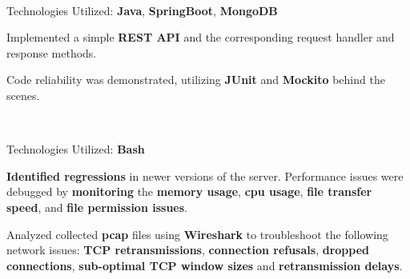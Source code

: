 \documentclass[]{deedy-resume-openfont}
\begin{document}
\begin{minipage}[t]{0.66\textwidth}
\\
\begin{tightemize}
\item Technologies Utilized: \textbf{Java}, \textbf{SpringBoot}, \textbf{MongoDB}
\item Implemented a simple \textbf{REST API} and the corresponding request handler and response methods.
\item Code reliability was demonstrated, utilizing \textbf{JUnit} and \textbf{Mockito} behind the scenes.
\end{tightemize}
\sectionsep

\\
\begin{tightemize}
\item Technologies Utilized: \textbf{Bash}
\item \textbf{Identified regressions} in newer versions of the server. Performance issues were debugged by \textbf{monitoring} the \textbf{memory usage}, \textbf{cpu usage}, \textbf{file transfer speed}, and \textbf{file permission issues}.
\item Analyzed collected \textbf{pcap} files using \textbf{Wireshark} to troubleshoot the following network issues: \textbf{TCP retransmissions}, \textbf{connection refusals}, \textbf{dropped connections}, \textbf{sub-optimal TCP window sizes} and \textbf{retransmission delays}.
\end{tightemize}
\sectionsep


\end{minipage}
\end{document}
